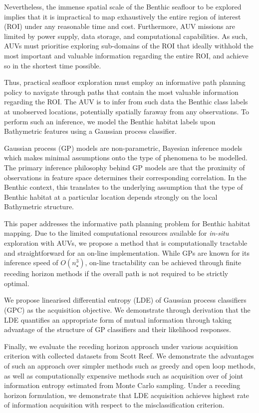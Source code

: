 \documentclass{article}
\begin{document}
	Nevertheless, the immense spatial scale of the Benthic seafloor to be explored implies that it is impractical to map exhaustively the entire region of interest (ROI) under any reasonable time and cost. Furthermore, AUV missions are limited by power supply, data storage, and computational capabilities. As such, AUVs must prioritise exploring sub-domains of the ROI that ideally withhold the most important and valuable information regarding the entire ROI, and achieve so in the shortest time possible.
	
	Thus, practical seafloor exploration must employ an informative path planning policy to navigate through paths that contain the most valuable information regarding the ROI. The AUV is to infer from such data the Benthic class labels at unobserved locations, potentially spatially faraway from any observations. To perform such an inference, we model the Benthic habitat labels upon Bathymetric features using a Gaussian process classifier.
	
	Gaussian process (GP) models are non-parametric, Bayesian inference models which makes minimal assumptions onto the type of phenomena to be modelled. The primary inference philosophy behind GP models are that the proximity of observations in feature space determines their corresponding correlation. In the Benthic context, this translates to the underlying assumption that the type of Benthic habitat at a particular location depends strongly on the local Bathymetric structure.
	
	This paper addresses the informative path planning problem for Benthic habitat mapping. Due to the limited computational resources available for \textit{in-situ} exploration with AUVs, we propose a method that is computationally tractable and straightforward for an on-line implementation. While GPs are known for its inference speed of $O(n_{\star}^{3})$, on-line tractability can be achieved through finite receding horizon methods if the overall path is not required to be strictly optimal.
	
	We propose linearised differential entropy (LDE) of Gaussian process classifiers (GPC) as the acquisition objective. We demonstrate through derivation that the LDE quantifies an appropriate form of mutual information through taking advantage of the structure of GP classifiers and their likelihood responses.
	
	Finally, we evaluate the receding horizon approach under various acquisition criterion with collected datasets from Scott Reef. We demonstrate the advantages of such an approach over simpler methods such as greedy and open loop methods, as well as computationally expensive methods such as acquisition over of joint information entropy estimated from Monte Carlo sampling.  Under a receding horizon formulation, we demonstrate that LDE acquisition achieves highest rate of information acquisition with respect to the misclassification criterion.
	
\end{document}
